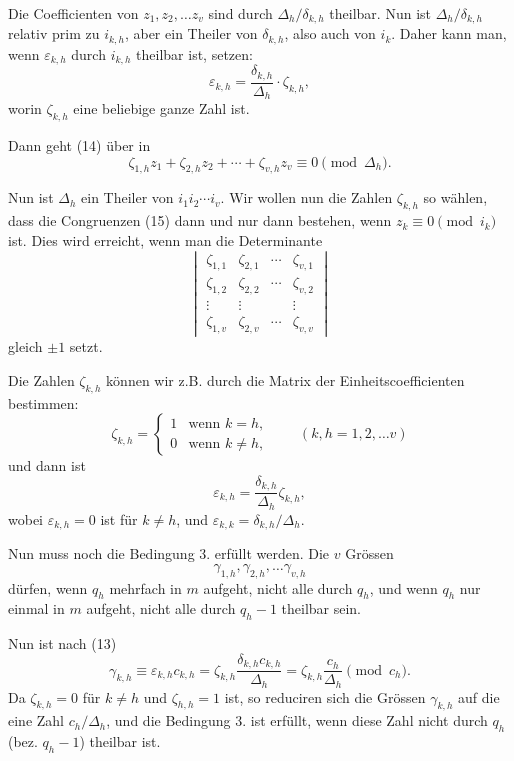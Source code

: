 \documentclass[12pt,a4paper]{article}
\theoremstyle{plain}
\theoremstyle{definition}
\theoremstyle{remark}
\begin{document}
Die Coefficienten von $z_1, z_2, \ldots z_v$ sind durch $\Delta_h/\delta_{k,h}$ theilbar. Nun ist $\Delta_h/\delta_{k,h}$ relativ prim zu $i_{k,h}$, aber ein Theiler von $\delta_{k,h}$, also auch von $i_k$. Daher kann man, wenn $\varepsilon_{k,h}$ durch $i_{k,h}$ theilbar ist, setzen:
\[
\varepsilon_{k,h} = \frac{\delta_{k,h}}{\Delta_h} \cdot \zeta_{k,h},
\]
worin $\zeta_{k,h}$ eine beliebige ganze Zahl ist.

Dann geht (14) über in
\begin{equation}\tag{15}
\zeta_{1,h} z_1 + \zeta_{2,h} z_2 + \cdots + \zeta_{v,h} z_v \equiv 0 \pmod{\Delta_h}.
\end{equation}

Nun ist $\Delta_h$ ein Theiler von $i_1 i_2 \cdots i_v$. Wir wollen nun die Zahlen $\zeta_{k,h}$ so wählen, dass die Congruenzen (15) dann und nur dann bestehen, wenn $z_k \equiv 0 \pmod{i_k}$ ist. Dies wird erreicht, wenn man die Determinante
\begin{equation}\tag{16}
\begin{vmatrix}
\zeta_{1,1} & \zeta_{2,1} & \cdots & \zeta_{v,1} \\
\zeta_{1,2} & \zeta_{2,2} & \cdots & \zeta_{v,2} \\
\vdots & \vdots & & \vdots \\
\zeta_{1,v} & \zeta_{2,v} & \cdots & \zeta_{v,v}
\end{vmatrix}
\end{equation}
gleich $\pm 1$ setzt.

Die Zahlen $\zeta_{k,h}$ können wir z.B. durch die Matrix der Einheitscoefficienten bestimmen:
\[
\zeta_{k,h} = \begin{cases} 1 & \text{wenn } k = h, \\ 0 & \text{wenn } k \neq h, \end{cases} \qquad (k,h = 1, 2, \ldots v)
\]
und dann ist
\[
\varepsilon_{k,h} = \frac{\delta_{k,h}}{\Delta_h} \zeta_{k,h},
\]
wobei $\varepsilon_{k,h} = 0$ ist für $k \neq h$, und $\varepsilon_{k,k} = \delta_{k,h}/\Delta_h$.

Nun muss noch die Bedingung 3. erfüllt werden. Die $v$ Grössen
\[
\gamma_{1,h}, \gamma_{2,h}, \ldots \gamma_{v,h}
\]
dürfen, wenn $q_h$ mehrfach in $m$ aufgeht, nicht alle durch $q_h$, und wenn $q_h$ nur einmal in $m$ aufgeht, nicht alle durch $q_h-1$ theilbar sein.

Nun ist nach (13)
\[
\gamma_{k,h} \equiv \varepsilon_{k,h} c_{k,h} = \zeta_{k,h} \frac{\delta_{k,h} c_{k,h}}{\Delta_h} = \zeta_{k,h} \frac{c_h}{\Delta_h} \pmod{c_h}.
\]
Da $\zeta_{k,h} = 0$ für $k \neq h$ und $\zeta_{h,h} = 1$ ist, so reduciren sich die Grössen $\gamma_{k,h}$ auf die eine Zahl $c_h/\Delta_h$, und die Bedingung 3. ist erfüllt, wenn diese Zahl nicht durch $q_h$ (bez. $q_h-1$) theilbar ist.
\end{document}
